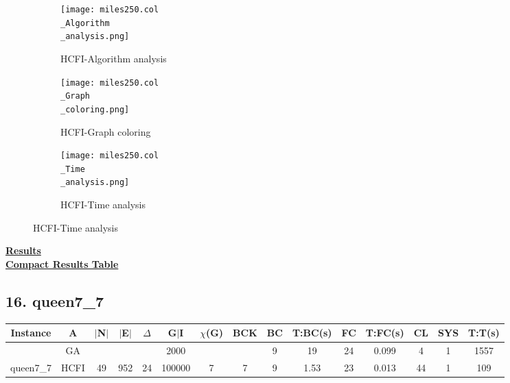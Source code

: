\documentclass[10pt]{article}
\begin{document}
\graphicspath{{./Core1/Solutions/HCFI/miles250.col}}
\begin{figure}[H]
\begin{subfigure}{.33\textwidth}
  \centering
  \texttt{[image: miles250.col\\\_Algorithm\\\_analysis.png]}
  \caption{HCFI-Algorithm analysis}
   \label{fig:subfig1}
\end{subfigure}%
\begin{subfigure}{.33\textwidth}
  \centering
  \texttt{[image: miles250.col\\\_Graph\\\_coloring.png]}
  \caption{HCFI-Graph coloring}
  \label{fig:subfig2}
\end{subfigure}
\begin{subfigure}{.33\textwidth}
  \centering
  \texttt{[image: miles250.col\\\_Time\\\_analysis.png]}
  \caption{HCFI-Time analysis}
  \end{subfigure}
\end{figure}
\vspace{2cm}
\begin{center}
\hyperlink{page.8}{\textbf{Results}}\\
\vspace{0.5cm}
\hyperlink{page.71}{\textbf{Compact Results Table}}
\end{center}
\pagebreak

\subsection*{\hspace{0,9073976cm} 16. queen7\_7}
\begin{table}[H]
\centering
\begin{tabular}{|c|c|c|c|c|c|c|c|c|c|c|c|c|c|c|}
\hline
Instance& A &$|$N$|$ & $|$E$|$ & $\Delta$ & G$|$I & $\chi$(G) &BCK&BC & T:BC(s) & FC & T:FC(s) & CL & SYS & T:T(s) \\ \hline \hline

&GA&       &                   &                     & 2000        &     \cellcolor{yellow} & {\cellcolor{yellow}}& {{\cellcolor{green}9}}
&19   & 24       &0.099                   & 4                   & 1         &1557        \\ \cline{2-2} \cline{6-6} \cline{9-15}
 \multirow{-2}{*}{queen7\_7} &HCFI   &\multirow{-2}{*}{49}   &\multirow{-2}{*}{952}     &\multirow{-2}{*}{24}     &100000     &\multirow{-2}{*}{\cellcolor{yellow}7}      & \multirow{-2}{*}{\cellcolor{yellow}7}    &{\cellcolor{green}9}     &1.53         &23    &0.013         &44    &1     &      109  \\ \hline 
\end{tabular}
\end{table}
\end{document}
